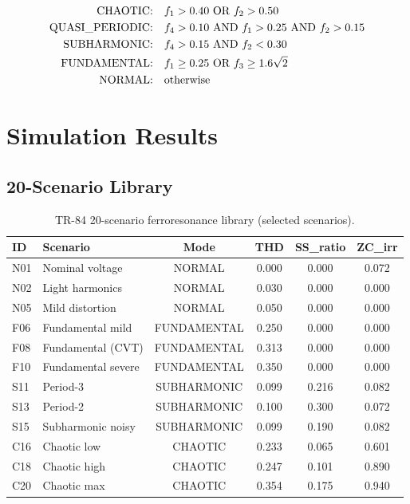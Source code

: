 \documentclass[11pt, a4paper]{article}
\begin{document}
\begin{align}
  \text{CHAOTIC:} \quad & f_1 > 0.40 \text{ OR } f_2 > 0.50 \notag\\
  \text{QUASI\_PERIODIC:} \quad & f_4 > 0.10 \text{ AND } f_1 > 0.25
    \text{ AND } f_2 > 0.15 \notag\\
  \text{SUBHARMONIC:} \quad & f_4 > 0.15 \text{ AND } f_2 < 0.30 \notag\\
  \text{FUNDAMENTAL:} \quad & f_1 \geq 0.25 \text{ OR } f_3 \geq 1.6\sqrt{2} \notag\\
  \text{NORMAL:} \quad & \text{otherwise}
  \label{eq:rules}
\end{align}

\section{Simulation Results}
\label{sec:results}

\subsection{20-Scenario Library}

\begin{table}[ht]
\centering
\caption{TR-84 20-scenario ferroresonance library (selected scenarios).}
\label{tab:scenarios}
\begin{tabular}{llcccc}
\toprule
ID & Scenario & Mode & THD & SS\_ratio & ZC\_irr \\
\midrule
N01 & Nominal voltage   & NORMAL      & 0.000 & 0.000 & 0.072 \\
N02 & Light harmonics   & NORMAL      & 0.030 & 0.000 & 0.000 \\
N05 & Mild distortion   & NORMAL      & 0.050 & 0.000 & 0.000 \\
F06 & Fundamental mild  & FUNDAMENTAL & 0.250 & 0.000 & 0.000 \\
F08 & Fundamental (CVT) & FUNDAMENTAL & 0.313 & 0.000 & 0.000 \\
F10 & Fundamental severe& FUNDAMENTAL & 0.350 & 0.000 & 0.000 \\
S11 & Period-3          & SUBHARMONIC & 0.099 & 0.216 & 0.082 \\
S13 & Period-2          & SUBHARMONIC & 0.100 & 0.300 & 0.072 \\
S15 & Subharmonic noisy & SUBHARMONIC & 0.099 & 0.190 & 0.082 \\
C16 & Chaotic low       & CHAOTIC     & 0.233 & 0.065 & 0.601 \\
C18 & Chaotic high      & CHAOTIC     & 0.247 & 0.101 & 0.890 \\
C20 & Chaotic max       & CHAOTIC     & 0.354 & 0.175 & 0.940 \\
\bottomrule
\end{tabular}
\end{table}
\end{document}
